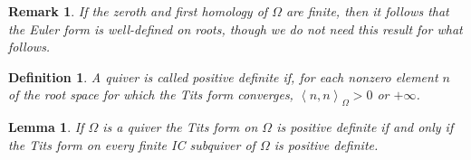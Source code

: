 \documentclass{article}
\newcommand{\bracket}[1]{\left \langle #1 \right\rangle}
\newtheorem{lemma}{Lemma}[section]
\newtheorem{definition}{Definition}
\newtheorem{remark}{Remark}[section]
\begin{document}
\begin{remark}
  If the zeroth and first homology of $\Omega$ are finite, then it follows that the Euler form is well-defined on roots, though we do not need this result for what follows.
\end{remark}


\begin{definition}
  A quiver is called \emph{positive definite} if, for each nonzero element $n$ of the root space for which the Tits form converges, $\bracket{n , n}_{\Omega} > 0$ or $+\infty$.
\end{definition}

\begin{lemma}\label{lm:Tits positive definite}
If $\Omega$ is a quiver  the Tits form on $\Omega$ is positive definite  if and only if the Tits form on every finite IC subquiver of $\Omega$ is positive definite.
\end{lemma}
\end{document}
